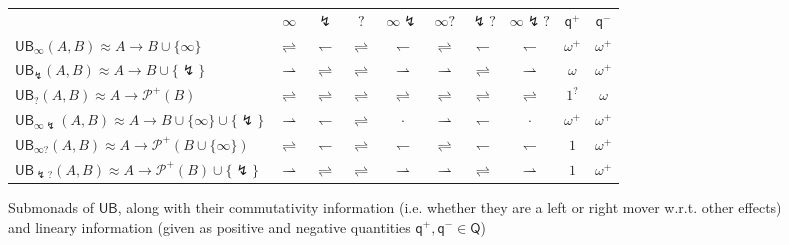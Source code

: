 \documentclass[acmsmall,screen,review]{acmart}
\newcommand{\mc}[1]{\ensuremath{\mathcal{#1}}}
\newcommand{\ms}[1]{\ensuremath{\mathsf{#1}}}
\newcommand{\rightmove}{\rightharpoonup}
\newcommand{\leftmove}{\leftharpoondown}
\newcommand{\slides}{\rightleftharpoons}
\newcommand{\oneq}{1}
\newcommand{\delq}{1^?}
\newcommand{\cpyq}{\omega^+}
\newcommand{\topq}{\omega}
\newcommand{\ubeff}{\lightning}
\begin{document}
\begin{figure}
  \begin{adjustbox}{minipage=1.1\textwidth,scale=0.9}
  \centering
  \begin{tabular}{l|ccccccccc}
    & $\infty$ & $\ubeff$ & $?$ & $\infty\ubeff$ & $\infty?$ & $\ubeff?$ & $\infty\ubeff?$ 
    & $\ms{q}^+$ & $\ms{q}^-$ \\
    $\ms{UB}_\infty(A, B) \approx A \to B \cup \{\infty\}$ 
    & $\slides$ & $\leftmove$ & $\slides$ & $\leftmove$ & $\slides$ & $\leftmove$ & $\leftmove$ 
    & $\cpyq$ & $\cpyq$ \\ 
    $\ms{UB}_\ubeff(A, B) \approx A \to B \cup \{\ubeff\}$ 
    & $\rightmove$ & $\slides$ & $\slides$ & $\rightmove$ & $\rightmove$ & $\slides$ & $\rightmove$ 
    & $\topq$ & $\cpyq$ \\
    $\ms{UB}_?(A, B) \approx A \to \mc{P}^+(B)$
    & $\slides$ & $\slides$ & $\slides$ & $\slides$ & $\slides$ & $\slides$ & $\slides$ 
    & $\delq$ & $\topq$ \\
    $\ms{UB}_{\infty\ubeff}(A, B) \approx A \to B \cup \{\infty\} \cup \{\ubeff\}$ 
    & $\rightmove$ & $\leftmove$ & $\slides$ & $\cdot$ & $\rightmove$  & $\leftmove$ & $\cdot$ 
    & $\cpyq$ & $\cpyq$ \\
    $\ms{UB}_{\infty?}(A, B) \approx A \to \mc{P}^+(B \cup \{\infty\})$ 
    & $\slides$ & $\leftmove$ & $\slides$ & $\leftmove$ & $\slides$ & $\leftmove$ & $\leftmove$ 
    & $\oneq$ & $\cpyq$ \\ 
    $\ms{UB}_{\ubeff?}(A, B) \approx A \to \mc{P}^+(B) \cup \{\ubeff\}$ 
    & $\rightmove$ & $\slides$ & $\slides$ & $\rightmove$ & $\rightmove$ & $\slides$ & $\rightmove$ 
    & $\oneq$ & $\cpyq$ \\
  \end{tabular}
  \end{adjustbox}
  \caption{
    Submonads of $\ms{UB}$, along with their commutativity information 
    (i.e. whether they are a left or right mover w.r.t. other effects) and lineary information
    (given as positive and negative quantities $\ms{q}^+, \ms{q}^- \in \ms{Q}$)
  }
  \Description{}
  \label{fig:ub-submonads}
\end{figure}
\end{document}
